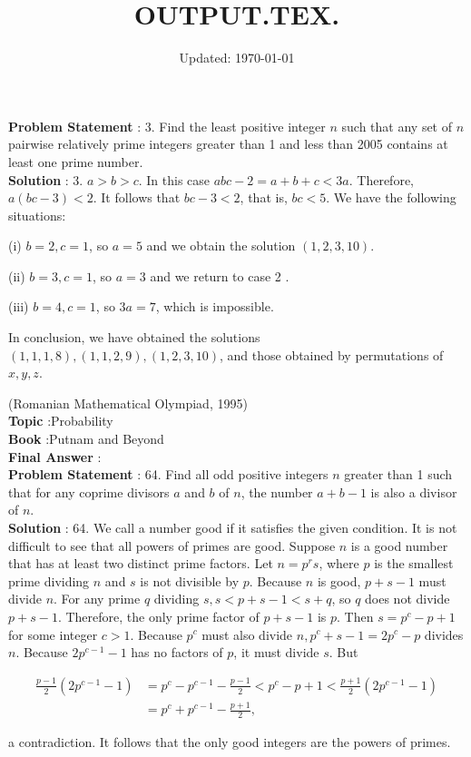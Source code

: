 \documentclass[10pt]{article}
\title{OUTPUT.TEX.}
\date{Updated: \today}
\author{}
\begin{document}
\textbf{Problem Statement} :
3. Find the least positive integer $n$ such that any set of $n$ pairwise relatively prime integers greater than 1 and less than 2005 contains at least one prime number. 
\\
\textbf{Solution} :
3. $a>b>c$. In this case $a b c-2=a+b+c<3 a$. Therefore, $a(b c-3)<2$. It follows that $b c-3<2$, that is, $b c<5$. We have the following situations:

(i) $b=2, c=1$, so $a=5$ and we obtain the solution $(1,2,3,10)$.

(ii) $b=3, c=1$, so $a=3$ and we return to case 2 .

(iii) $b=4, c=1$, so $3 a=7$, which is impossible.

In conclusion, we have obtained the solutions $(1,1,1,8),(1,1,2,9),(1,2,3,10)$, and those obtained by permutations of $x, y, z$.

(Romanian Mathematical Olympiad, 1995)
\\
\textbf{Topic} :Probability\\
\textbf{Book} :Putnam and Beyond\\
\textbf{Final Answer} :\\


\textbf{Problem Statement} :
64. Find all odd positive integers $n$ greater than 1 such that for any coprime divisors $a$ and $b$ of $n$, the number $a+b-1$ is also a divisor of $n$. 
\\
\textbf{Solution} :
64. We call a number good if it satisfies the given condition. It is not difficult to see that all powers of primes are good. Suppose $n$ is a good number that has at least two distinct prime factors. Let $n=p^{r} s$, where $p$ is the smallest prime dividing $n$ and $s$ is not divisible by $p$. Because $n$ is good, $p+s-1$ must divide $n$. For any prime $q$ dividing $s, s<p+s-1<s+q$, so $q$ does not divide $p+s-1$. Therefore, the only prime factor of $p+s-1$ is $p$. Then $s=p^{c}-p+1$ for some integer $c>1$. Because $p^{c}$ must also divide $n, p^{c}+s-1=2 p^{c}-p$ divides $n$. Because $2 p^{c-1}-1$ has no factors of $p$, it must divide $s$. But

$$
\begin{aligned}
\frac{p-1}{2}\left(2 p^{c-1}-1\right) &=p^{c}-p^{c-1}-\frac{p-1}{2}<p^{c}-p+1<\frac{p+1}{2}\left(2 p^{c-1}-1\right) \\
&=p^{c}+p^{c-1}-\frac{p+1}{2},
\end{aligned}
$$

a contradiction. It follows that the only good integers are the powers of primes.
\end{document}
